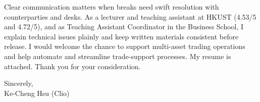 \documentclass[11pt,letterpaper]{article}
\begin{document}
Clear communication matters when breaks need swift resolution with counterparties and desks. As a lecturer and teaching assistant at HKUST (4.53/5 and 4.72/5), and as Teaching Assistant Coordinator in the Business School, I explain technical issues plainly and keep written materials consistent before release. I would welcome the chance to support multi-asset trading operations and help automate and streamline trade-support processes. My resume is attached. Thank you for your consideration.

\vspace{0.4em}
Sincerely,\\[0.35em]
Ke-Cheng Hsu (Clio)
\end{document}
